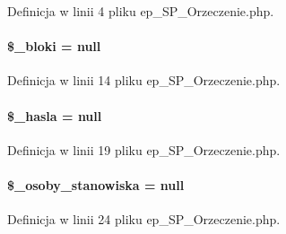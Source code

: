 Definicja w linii 4 pliku ep\-\_\-\-S\-P\-\_\-\-Orzeczenie.\-php.

\hypertarget{classep___s_p___orzeczenie_aee90f3b27d0ab721378343d2bd0d71ba}{
\paragraph[{\$\-\_\-bloki}]{\setlength{\rightskip}{0pt plus 5cm}\$\-\_\-bloki = null\hspace{0.3cm}{\ttfamily [protected]}}}\label{classep___s_p___orzeczenie_aee90f3b27d0ab721378343d2bd0d71ba}


Definicja w linii 14 pliku ep\-\_\-\-S\-P\-\_\-\-Orzeczenie.\-php.

\hypertarget{classep___s_p___orzeczenie_a7b7a4173e85d440890bd5305cfd10667}{
\paragraph[{\$\-\_\-hasla}]{\setlength{\rightskip}{0pt plus 5cm}\$\-\_\-hasla = null\hspace{0.3cm}{\ttfamily [protected]}}}\label{classep___s_p___orzeczenie_a7b7a4173e85d440890bd5305cfd10667}


Definicja w linii 19 pliku ep\-\_\-\-S\-P\-\_\-\-Orzeczenie.\-php.

\hypertarget{classep___s_p___orzeczenie_a652b265eb5a0c97e3cbad17334ceffe8}{
\paragraph[{\$\-\_\-osoby\-\_\-stanowiska}]{\setlength{\rightskip}{0pt plus 5cm}\$\-\_\-osoby\-\_\-stanowiska = null\hspace{0.3cm}{\ttfamily [protected]}}}\label{classep___s_p___orzeczenie_a652b265eb5a0c97e3cbad17334ceffe8}


Definicja w linii 24 pliku ep\-\_\-\-S\-P\-\_\-\-Orzeczenie.\-php.

